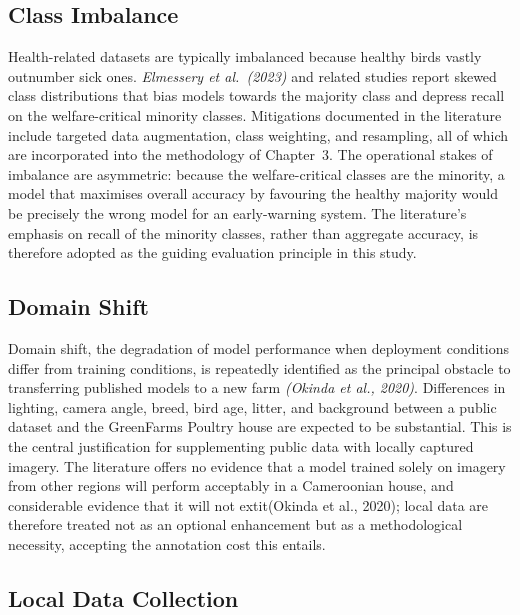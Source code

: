 \documentclass[12pt,a4paper]{report}
\begin{document}
\subsection{Class Imbalance}

Health-related datasets are typically imbalanced because healthy birds vastly outnumber sick ones. \textit{Elmessery et al.\ (2023)} and related studies report skewed class distributions that bias models towards the majority class and depress recall on the welfare-critical minority classes. Mitigations documented in the literature include targeted data augmentation, class weighting, and resampling, all of which are incorporated into the methodology of Chapter~3. The operational stakes of imbalance are asymmetric: because the welfare-critical classes are the minority, a model that maximises overall accuracy by favouring the healthy majority would be precisely the wrong model for an early-warning system. The literature's emphasis on recall of the minority classes, rather than aggregate accuracy, is therefore adopted as the guiding evaluation principle in this study.

\subsection{Domain Shift}

Domain shift, the degradation of model performance when deployment conditions differ from training conditions, is repeatedly identified as the principal obstacle to transferring published models to a new farm \textit{(Okinda et al., 2020)}. Differences in lighting, camera angle, breed, bird age, litter, and background between a public dataset and the GreenFarms Poultry house are expected to be substantial. This is the central justification for supplementing public data with locally captured imagery. The literature offers no evidence that a model trained solely on imagery from other regions will perform acceptably in a Cameroonian house, and considerable evidence that it will not 	extit{(Okinda et al., 2020)}; local data are therefore treated not as an optional enhancement but as a methodological necessity, accepting the annotation cost this entails.

\subsection{Local Data Collection}
\end{document}
